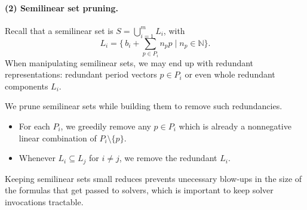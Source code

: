 

\paragraph{(2) Semilinear set pruning.}  
Recall that a semilinear set is $S=\bigcup_{i=1}^m L_i$, with
\[
\displaystyle L_i=\{\,b_i+\sum_{p\in P_i}n_p p\mid n_p\in\mathbb N\}.
\]
When manipulating semilinear sets, we may end up with redundant representations:
redundant period vectors $p \in P_i$ or even whole redundant components $L_i$.

We prune semilinear sets while building them to remove such redundancies.
\begin{itemize}
  \item For each $P_i$, we greedily remove any $p \in P_i$ which is already a
    nonnegative linear combination of $P_i \setminus \{p\}$.
  \item Whenever $L_i \subseteq L_j$ for $i \neq j$, we remove the redundant $L_i$.
\end{itemize}

Keeping semilinear sets small reduces prevents unecessary blow-ups in the size of the formulas that get passed to solvers, which is important to keep solver invocations tractable.


